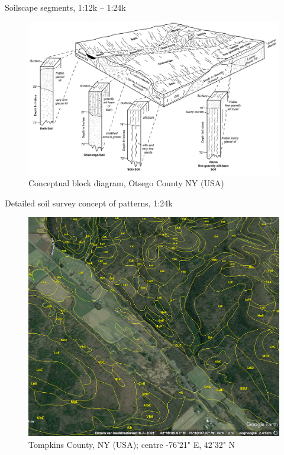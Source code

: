 \documentclass[aspectratio=169]{beamer}
\begin{document}
\begin{frame}{Soilscape segments, 1:12k -- 1:24k}
    \begin{figure}
        \centering
\includegraphics[height=0.65\textheight]{./graphics_david/NY-2010-09-28-14.pdf}\\
{Conceptual block diagram, Otsego County NY (USA)}
     \end{figure}
\end{frame}

\begin{frame}{Detailed soil survey concept of patterns, 1:24k}
    \begin{figure}
        \centering
\includegraphics[height=0.7\textheight]{./graphics_david/PonyHollow_SoilWeb_Screenshot.png}\\
{Tompkins County, NY (USA); centre -76'21" E, 42'32" N}
     \end{figure}
    \end{frame}
\end{document}
